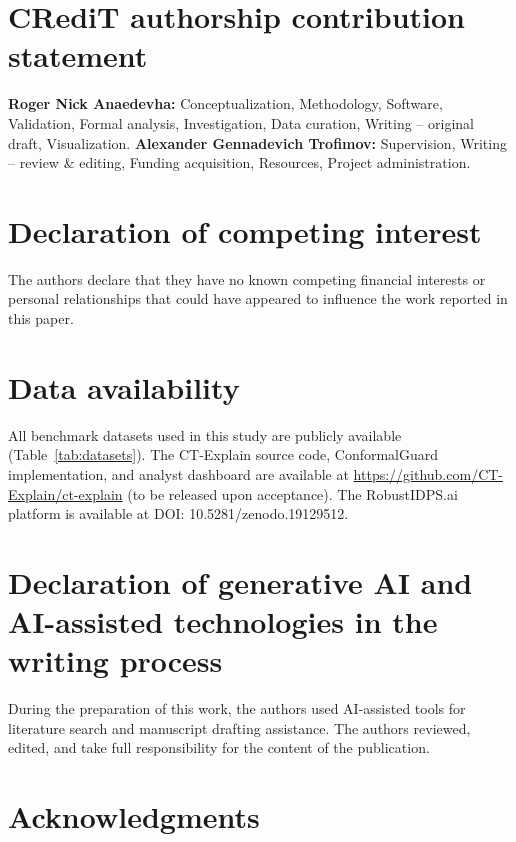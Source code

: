 \documentclass[preprint,review,12pt]{elsarticle}
\begin{document}
\section*{CRediT authorship contribution statement}

\textbf{Roger Nick Anaedevha:} Conceptualization, Methodology, Software, Validation, Formal analysis, Investigation, Data curation, Writing -- original draft, Visualization. \textbf{Alexander Gennadevich Trofimov:} Supervision, Writing -- review \& editing, Funding acquisition, Resources, Project administration.


\section*{Declaration of competing interest}

The authors declare that they have no known competing financial interests or personal relationships that could have appeared to influence the work reported in this paper.


\section*{Data availability}

All benchmark datasets used in this study are publicly available (Table~\ref{tab:datasets}). The CT-Explain source code, ConformalGuard implementation, and analyst dashboard are available at \url{https://github.com/CT-Explain/ct-explain} (to be released upon acceptance). The RobustIDPS.ai platform is available at DOI: 10.5281/zenodo.19129512.


\section*{Declaration of generative AI and AI-assisted technologies in the writing process}

During the preparation of this work, the authors used AI-assisted tools for literature search and manuscript drafting assistance. The authors reviewed, edited, and take full responsibility for the content of the publication.


\section*{Acknowledgments}
\end{document}
